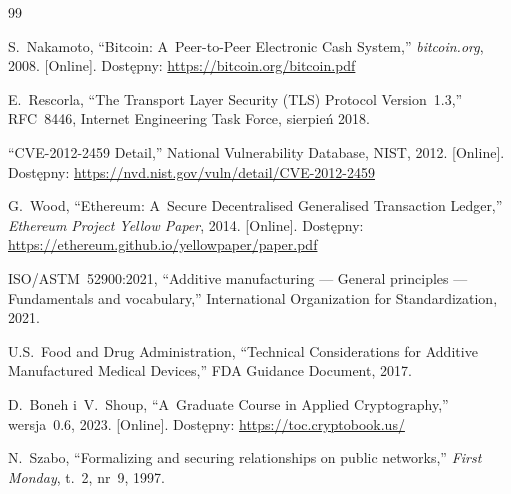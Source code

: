 \documentclass[10pt,conference,a4paper]{IEEEtran}
\begin{document}
\begin{thebibliography}{99}

S.~Nakamoto, ``Bitcoin: A~Peer-to-Peer Electronic Cash
System,'' \textit{bitcoin.org}, 2008. [Online]. Dostępny:
\url{https://bitcoin.org/bitcoin.pdf}

E.~Rescorla, ``The Transport Layer Security (TLS) Protocol
Version~1.3,'' RFC~8446, Internet Engineering Task Force,
sierpień 2018.

``CVE-2012-2459 Detail,'' National Vulnerability Database,
NIST, 2012.
[Online]. Dostępny:
\url{https://nvd.nist.gov/vuln/detail/CVE-2012-2459}

G.~Wood, ``Ethereum: A~Secure Decentralised Generalised
Transaction Ledger,'' \textit{Ethereum Project Yellow Paper},
2014. [Online]. Dostępny:
\url{https://ethereum.github.io/yellowpaper/paper.pdf}

ISO/ASTM~52900:2021, ``Additive manufacturing --- General
principles --- Fundamentals and vocabulary,'' International
Organization for Standardization, 2021.

U.S.~Food and Drug Administration, ``Technical Considerations
for Additive Manufactured Medical Devices,'' FDA Guidance
Document, 2017.

D.~Boneh i~V.~Shoup, ``A~Graduate Course in Applied
Cryptography,'' wersja~0.6, 2023. [Online]. Dostępny:
\url{https://toc.cryptobook.us/}

N.~Szabo, ``Formalizing and securing relationships on public
networks,'' \textit{First Monday}, t.~2, nr~9, 1997.

\end{thebibliography}
\end{document}
